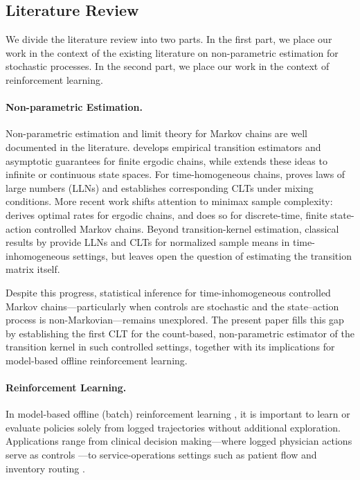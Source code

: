 \documentclass[twoside,11pt]{article}
\numberwithin{equation}{section}
\begin{document}
\subsection{Literature Review}
\label{sec:lit-review}
We divide the literature review into two parts. 
In the first part, we place our work in the context of the existing literature on non-parametric estimation for stochastic processes.
In the second part, we place our work in the context of reinforcement learning.

\paragraph{Non-parametric Estimation.} Non-parametric estimation and limit theory for Markov chains are well documented in the literature.
\cite{billingsley1961statistical} develops empirical transition estimators and asymptotic guarantees for finite ergodic chains, while \cite{yakowitz1979nonparametric} extends these ideas to infinite or continuous state spaces.
For time-homogeneous chains, \cite{geyer1998markov} proves laws of large numbers (LLNs) and \cite{jones2004markov} establishes corresponding CLTs under mixing conditions.
More recent work shifts attention to minimax sample complexity: \cite{wolfer_estimating_2019,wolfer2021statistical} derives optimal rates for ergodic chains, and \cite{banerjee2025off} does so for discrete-time, finite state-action controlled Markov chains.
Beyond transition-kernel estimation, classical results by \cite{dobrushin1956central,dobrushin1956centralII,rosenblatt1963some,rosenblatt1964some} provide LLNs and CLTs for normalized sample means in time-inhomogeneous settings, but leaves open the question of estimating the transition matrix itself.

Despite this progress, statistical inference for time-inhomogeneous controlled Markov chains—particularly when controls are stochastic and the state–action process is non-Markovian—remains unexplored.
The present paper fills this gap by establishing the first CLT for the count-based, non-parametric estimator of the transition kernel in such controlled settings, together with its implications for model-based offline reinforcement learning.

\paragraph{Reinforcement Learning.} In model-based offline (batch) reinforcement learning \citep{levine2020offline, kidambi2020morel, yu_mopo_2020}, it is important to learn or evaluate policies solely from logged trajectories without additional exploration.
Applications range from clinical decision making—where logged physician actions serve as controls \citep{shortreed2011informing, liu2020reinforcement, yu2021reinforcement, chen2021probabilistic}—to service-operations settings such as patient flow and inventory routing \citep{armony2015patient}.
\end{document}
